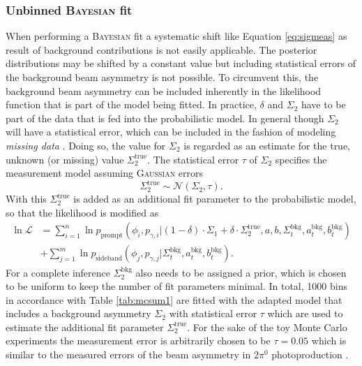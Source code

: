 \subsubsection{Unbinned \textsc{Bayesian} fit}
When performing a \textsc{Bayesian} fit a systematic shift like Equation \eqref{eq:sigmeas} as result of background contributions is not easily applicable. The posterior distributions may be shifted by a constant value but including statistical errors of the background beam asymmetry is not possible. To circumvent this, the background beam asymmetry can be included inherently in the likelihood function that is part of the model being fitted. In practice, $\delta$ and $\Sigma_2$ have to be part of the data that is fed into the probabilistic model. In general though $\Sigma_2$ will have a statistical error, which can be included in the fashion of modeling \emph{missing data} \cite{stan}. Doing so, the value for $\Sigma_2$ is regarded as an estimate for the true, unknown (or missing) value $\Sigma_2^\text{true}$. The statistical error $\tau$ of $\Sigma_2$ specifies the measurement model assuming \textsc{Gaussian} errors 
\begin{equation}
	\Sigma_2^\text{true}\sim\mathcal{N}\left(\Sigma_2,\tau\right).
\end{equation}
 With this $\Sigma_2^\text{true}$ is added as an additional fit parameter to the probabilistic model, so that the  likelihood is modified as  
 \begin{equation}
 	\begin{aligned}
 		\ln\mathcal{L}&=\sum_{i=1}^{n}\ln p_\text{prompt}\left(\phi_i,p_{\gamma,i}\big|(1-\delta)\cdot\Sigma_1+\delta\cdot\Sigma_2^\text{true},a,b,\Sigma^\text{bkg}_t,a^\text{bkg}_t,b^\text{bkg}_t\right)\\&+\sum_{j=1}^m \ln p_\text{sideband}\left(\phi_j,p_{\gamma,j}\big|\Sigma^\text{bkg}_t,a^\text{bkg}_t,b^\text{bkg}_t\right).\label{eq:likalt}
 	\end{aligned}
 \end{equation}
For a complete inference $\Sigma_2^\text{bkg}$ also needs to be assigned a prior, which is chosen to be uniform to keep the number of fit parameters minimal. In total, 1000 bins in accordance with Table \ref{tab:mcsum1} are fitted with the adapted model that includes a background asymmetry $\Sigma_2$ with statistical error $\tau$ which are used to estimate the additional fit parameter $\Sigma_2^\text{true}$. For the sake of the toy Monte Carlo experiments the measurement error is arbitrarily chosen to be $\tau=0.05$ which is similar to the measured errors of the beam asymmetry in $2\pi^0$ photoproduction \cite{mahlbergphd}.


